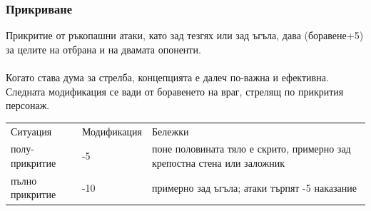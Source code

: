 \subsubsection{Прикриване}
Прикритие от ръкопашни атаки, като зад тезгях или зад ъгъла, дава (боравене+5) за целите на отбрана и на двамата опоненти.
\\
\\
Когато става дума за стрелба, концепцията е далеч по-важна и ефективна.
Следната модификация се вади от боравенето на враг, стрелящ по прикрития персонаж.
\\
\begin{tabular}{l | l | p{10cm}}
Ситуация        & Модификация & Бележки \\
полу-прикритие  & -5          & поне половината тяло е скрито, примерно зад крепостна стена или заложник \\
пълно прикритие & -10         & примерно зад ъгъла; атаки търпят -5 наказание                            \\
\end{tabular}

 

